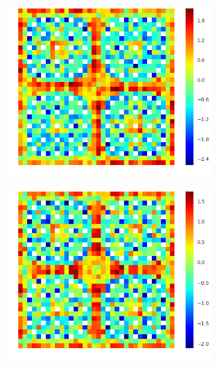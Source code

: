 \begin{figure}[h!]
\begin{subfigure}{.33\textwidth}
\end{subfigure}%
\begin{subfigure}{.33\textwidth}
  \centering
  \includegraphics[width=\linewidth]{figures/quantification/2x2/null-capt-err-8}
  \caption{}
  \label{fig:chap8-2x2-null-capt-8}
\end{subfigure}%
\begin{subfigure}{.33\textwidth}
  \centering
  \includegraphics[width=\linewidth]{figures/quantification/2x2/null-capt-err-70}
  \caption{}
  \label{fig:chap8-2x2-null-capt-70}
\end{subfigure}

\end{figure}
